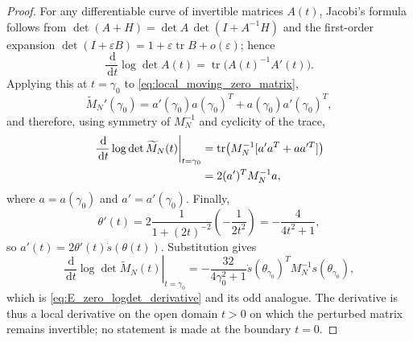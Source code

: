 \documentclass[11pt]{amsart}
\numberwithin{equation}{section}
\theoremstyle{plain}
\theoremstyle{definition}
\theoremstyle{remark}
\newcommand{\dd}{\,\mathrm d}
\begin{document}
\begin{proof}
For any differentiable curve of invertible matrices $A(t)$, Jacobi's formula follows from
$\det(A+H)=\det A\,\det(I+A^{-1}H)$ and the first-order expansion
$\det(I+\varepsilon B)=1+\varepsilon\operatorname{tr}B+o(\varepsilon)$; hence
\begin{equation}
\frac{\dd}{\dd t}\log\det A(t)
=\operatorname{tr}\bigl(A(t)^{-1}A'(t)\bigr).
\end{equation}
Applying this at $t=\gamma_0$ to \eqref{eq:local_moving_zero_matrix},
\begin{equation}
\widetilde M_N'(\gamma_0)
=a'(\gamma_0)a(\gamma_0)^T+a(\gamma_0)a'(\gamma_0)^T,
\end{equation}
and therefore, using symmetry of $M_N^{-1}$ and cyclicity of the trace,
\begin{align}
\left.\frac{\dd}{\dd t}\log\det\widetilde M_N(t)\right|_{t=\gamma_0}
&=\operatorname{tr}\!\left(M_N^{-1}
[a'a^T+aa'^T]\right)\notag\\
&=2(a')^TM_N^{-1}a,
\end{align}
where $a=a(\gamma_0)$ and $a'=a'(\gamma_0)$.  Finally,
\begin{equation}
\theta'(t)
=2\frac{1}{1+(2t)^{-2}}\left(-\frac{1}{2t^2}\right)
=-\frac{4}{4t^2+1},
\label{eq:theta_gamma_derivative}
\end{equation}
so $a'(t)=2\theta'(t)\dot s(\theta(t))$.  Substitution gives
\begin{equation}
\left.\frac{\dd}{\dd t}\log\det\widetilde M_N(t)\right|_{t=\gamma_0}
=-\frac{32}{4\gamma_0^2+1}
\dot s(\theta_{\gamma_0})^TM_N^{-1}s(\theta_{\gamma_0}),
\end{equation}
which is \eqref{eq:E_zero_logdet_derivative} and its odd analogue.  The derivative is thus a local derivative on the open domain $t>0$ on which the perturbed matrix remains invertible; no statement is made at the boundary $t=0$.
\end{proof}
\end{document}
